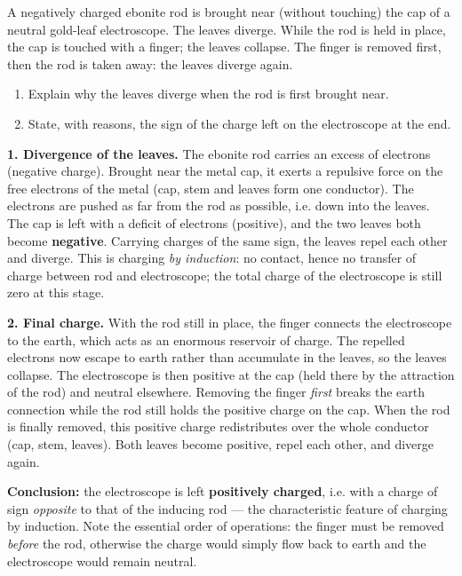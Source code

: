 \documentclass[11pt]{article}
\begin{document}
\begin{exoresolu}
A negatively charged ebonite rod is brought near (without touching) the cap of a neutral gold-leaf electroscope. The leaves diverge. While the rod is held in place, the cap is touched with a finger; the leaves collapse. The finger is removed first, then the rod is taken away: the leaves diverge again.
\begin{enumerate}
\item Explain why the leaves diverge when the rod is first brought near.
\item State, with reasons, the sign of the charge left on the electroscope at the end.
\end{enumerate}
\tcblower
\textbf{1. Divergence of the leaves.} The ebonite rod carries an excess of electrons (negative charge). Brought near the metal cap, it exerts a repulsive force on the free electrons of the metal (cap, stem and leaves form one conductor). The electrons are pushed as far from the rod as possible, i.e. down into the leaves. The cap is left with a deficit of electrons (positive), and the two leaves both become \textbf{negative}. Carrying charges of the same sign, the leaves repel each other and diverge. This is charging \emph{by induction}: no contact, hence no transfer of charge between rod and electroscope; the total charge of the electroscope is still zero at this stage.

\textbf{2. Final charge.} With the rod still in place, the finger connects the electroscope to the earth, which acts as an enormous reservoir of charge. The repelled electrons now escape to earth rather than accumulate in the leaves, so the leaves collapse. The electroscope is then positive at the cap (held there by the attraction of the rod) and neutral elsewhere. Removing the finger \emph{first} breaks the earth connection while the rod still holds the positive charge on the cap. When the rod is finally removed, this positive charge redistributes over the whole conductor (cap, stem, leaves). Both leaves become positive, repel each other, and diverge again.

\textbf{Conclusion:} the electroscope is left \textbf{positively charged}, i.e. with a charge of sign \emph{opposite} to that of the inducing rod --- the characteristic feature of charging by induction. Note the essential order of operations: the finger must be removed \emph{before} the rod, otherwise the charge would simply flow back to earth and the electroscope would remain neutral.
\end{exoresolu}
\end{document}
